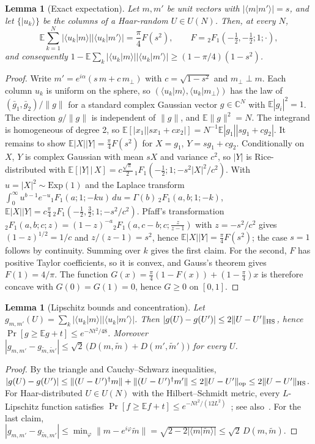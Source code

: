 \documentclass[11pt]{article}
\newtheorem{lemma}[theorem]{Lemma}
\theoremstyle{definition}
\theoremstyle{remark}
\newcommand{\ket}[1]{|#1\rangle}
\newcommand{\braket}[2]{\langle #1|#2\rangle}
\newcommand{\E}{\mathbb{E}}
\begin{document}
\begin{lemma}[Exact expectation]\label{lem:expect}
Let $m,m'$ be unit vectors with $|\braket{m}{m'}|=s$, and let $\{\ket{u_k}\}$ be the columns of a Haar-random $U\in U(N)$. Then, at every $N$,
\[
\E\sum_{k=1}^N|\braket{u_k}{m}||\braket{u_k}{m'}|=\frac\pi4F(s^2),\qquad F={}_2F_1(-\tfrac12,-\tfrac12;1;\cdot),
\]
and consequently $1-\E\sum_k|\braket{u_k}{m}||\braket{u_k}{m'}|\ge(1-\pi/4)(1-s^2)$.
\end{lemma}
\begin{proof}
Write $m'=e^{i\alpha}(s\,m+c\,m_\perp)$ with $c=\sqrt{1-s^2}$ and $m_\perp\perp m$. Each column $u_k$ is uniform on the sphere, so $(\braket{u_k}{m},\braket{u_k}{m_\perp})$ has the law of $(\bar g_1,\bar g_2)/\|g\|$ for a standard complex Gaussian vector $g\in\mathbb C^N$ with $\E|g_i|^2=1$. The direction $g/\|g\|$ is independent of $\|g\|$, and $\E\|g\|^2=N$. The integrand is homogeneous of degree 2, so $\E[|x_1||sx_1+cx_2|]=N^{-1}\E|g_1||sg_1+cg_2|$. It remains to show $\E|X||Y|=\frac\pi4F(s^2)$ for $X=g_1$, $Y=sg_1+cg_2$. Conditionally on $X$, $Y$ is complex Gaussian with mean $sX$ and variance $c^2$, so $|Y|$ is Rice-distributed with $\E[|Y|\,|\,X]=c\frac{\sqrt\pi}{2}\,{}_1F_1(-\tfrac12;1;-s^2|X|^2/c^2)$. With $u=|X|^2\sim\mathrm{Exp}(1)$ and the Laplace transform $\int_0^\infty u^{b-1}e^{-u}{}_1F_1(a;1;-ku)\,du=\Gamma(b)\,{}_2F_1(a,b;1;-k)$, $\E|X||Y|=c\frac\pi4\,{}_2F_1(-\tfrac12,\tfrac32;1;-s^2/c^2)$. Pfaff's transformation ${}_2F_1(a,b;c;z)=(1-z)^{-a}{}_2F_1(a,c-b;c;\frac{z}{z-1})$ with $z=-s^2/c^2$ gives $(1-z)^{1/2}=1/c$ and $z/(z-1)=s^2$, hence $\E|X||Y|=\frac\pi4F(s^2)$; the case $s=1$ follows by continuity. Summing over $k$ gives the first claim. For the second, $F$ has positive Taylor coefficients, so it is convex, and Gauss's theorem gives $F(1)=4/\pi$. The function $G(x)=\frac\pi4(1-F(x))+(1-\frac\pi4)x$ is therefore concave with $G(0)=G(1)=0$, hence $G\ge0$ on $[0,1]$.
\end{proof}

\begin{lemma}[Lipschitz bounds and concentration]\label{lem:conc}
Let $g_{m,m'}(U)=\sum_k|\braket{u_k}{m}||\braket{u_k}{m'}|$. Then $|g(U)-g(U')|\le2\|U-U'\|_{\rm HS}$, hence $\Pr[g\ge\E g+t]\le e^{-Nt^2/48}$. Moreover $|g_{m,m'}-g_{\tilde m,\tilde m'}|\le\sqrt2\,\big(D(m,\tilde m)+D(m',\tilde m')\big)$ for every $U$.
\end{lemma}
\begin{proof}
By the triangle and Cauchy--Schwarz inequalities, $|g(U)-g(U')|\le\|(U-U')^\dagger m\|+\|(U-U')^\dagger m'\|\le2\|U-U'\|_{\rm op}\le2\|U-U'\|_{\rm HS}$. For Haar-distributed $U\in U(N)$ with the Hilbert--Schmidt metric, every $L$-Lipschitz function satisfies $\Pr[f\ge\E f+t]\le e^{-Nt^2/(12L^2)}$~\cite[Cor.~17]{MeckesMeckes2013}; see also~\cite[Ch.~5]{Meckes2019}. For the last claim, $|g_{m,m'}-g_{\tilde m,m'}|\le\min_\varphi\|m-e^{i\varphi}\tilde m\|=\sqrt{2-2|\braket{m}{\tilde m}|}\le\sqrt2\,D(m,\tilde m)$.
\end{proof}
\end{document}
